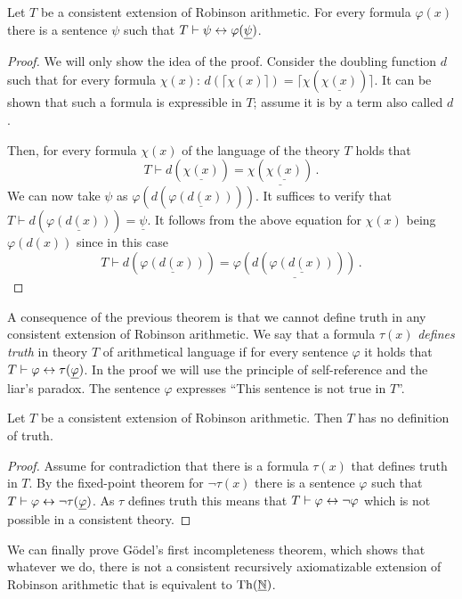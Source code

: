\begin{theorem}
Let $T$ be a consistent extension of Robinson arithmetic. For every formula $\varphi(x)$ there is a sentence $\psi$ such that $T \vdash \psi \leftrightarrow \varphi(\underline{\psi})$.
\end{theorem}
\begin{proof}
We will only show the idea of the proof. Consider the doubling function $d$ such that for every formula $\chi(x)$: $d(\lceil \chi(x) \rceil) = \lceil \chi(\underline{\chi (x)}) \rceil$. It can be shown that such a formula is expressible in $T$; assume it is by a term also called $d$.

Then, for every formula $\chi(x)$ of the language of the theory $T$ holds that $$T \vdash d(\underline{\chi(x)}) = \underline{\chi(\underline{\chi(x)})}\,.$$ We can now take $\psi$ as $\varphi(d(\underline{\varphi(d(x))}))$. It suffices to verify that $T \vdash d(\underline{\varphi(d(x))}) = \underline{\psi}$. It follows from the above equation for $\chi(x)$ being $\varphi(d(x))$ since in this case $$T \vdash d(\underline{\varphi(d(x))}) = \underline{\varphi(d(\underline{\varphi(d(x))}))}\,.$$
\end{proof}

A consequence of the previous theorem is that we cannot define truth in any consistent extension of Robinson arithmetic. We say that a formula $\tau(x)$ \emph{defines truth} in theory $T$ of arithmetical language if for every sentence $\varphi$ it holds that $T \vdash \varphi \leftrightarrow \tau(\underline{\varphi})$. In the proof we will use the principle of self-reference and the liar's paradox. The sentence $\varphi$ expresses ``This sentence is not true in $T$''. 

\begin{theorem}
Let $T$ be a consistent extension of Robinson arithmetic. Then $T$ has no definition of truth. 
\end{theorem}
\begin{proof}
Assume for contradiction that there is a formula $\tau(x)$ that defines truth in $T$. By the fixed-point theorem for $\neg \tau(x)$ there is a sentence $\varphi$ such that $T \vdash \varphi \leftrightarrow \neg \tau(\underline{\varphi})$. As $\tau$ defines truth this means that $T \vdash \varphi \leftrightarrow \neg \varphi$ which is not possible in a consistent theory.
\end{proof}

We can finally prove Gödel's first incompleteness theorem, which shows that whatever we do, there is not a consistent recursively axiomatizable extension of Robinson arithmetic that is equivalent to $\operatorname{Th}(\underline{\mathbb{N}})$.

